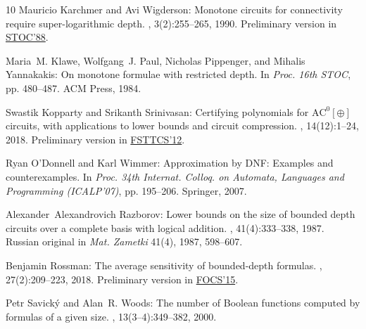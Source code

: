\documentclass[11pt]{article}
\numberwithin{equation}{section}
\theoremstyle{definition}
\theoremstyle{plain}
\begin{document}
\begin{thebibliography}{10}
{\sc Mauricio Karchmer and Avi Wigderson}: Monotone circuits for connectivity
  require super-logarithmic depth.
, 3(2):255--265, 1990.
\newblock Preliminary version in
  \href{http://doi.org/10.1145/62212.62265}{STOC'88}.
\newblock [\epfmtdoi{10.1137/0403021}]

{\sc Maria~M. Klawe, Wolfgang~J. Paul, Nicholas Pippenger, and Mihalis
  Yannakakis}: On monotone formulae with restricted depth.
\newblock In {\em Proc. 16th STOC}, pp. 480--487. ACM Press, 1984.
\newblock [\epfmtdoi{10.1145/800057.808717}]

{\sc Swastik Kopparty and Srikanth Srinivasan}: Certifying polynomials for
  $\mathrm{AC}^0[\oplus]$ circuits, with applications to lower bounds and
  circuit compression.
, 14(12):1--24, 2018.
\newblock Preliminary version in
  \href{http://drops.dagstuhl.de/opus/volltexte/2012/3846/}{FSTTCS'12}.

{\sc Ryan O'Donnell and Karl Wimmer}: Approximation by {DNF:} {E}xamples and
  counterexamples.
\newblock In {\em Proc. 34th Internat. Colloq. on Automata, Languages and
  Programming (ICALP'07)}, pp. 195--206. Springer, 2007.
\newblock [\epfmtdoi{10.1007/978-3-540-73420-8\_19}]

{\sc Alexander~Alexandrovich Razborov}: Lower bounds on the size of bounded
  depth circuits over a complete basis with logical addition.
,
  41(4):333--338, 1987.
\newblock Russian original in \emph{Mat. Zametki} 41(4), 1987, 598--607.
\newblock [\epfmtdoi{10.1007/BF01137685}]

{\sc Benjamin Rossman}: The average sensitivity of bounded-depth formulas.
, 27(2):209--223, 2018.
\newblock Preliminary version in
  \href{http://doi.org/10.1109/FOCS.2015.33}{FOCS'15}.

{\sc Petr Savick\'y and Alan~R. Woods}: The number of {B}oolean functions
  computed by formulas of a given size.
, 13(3--4):349--382, 2000.


\end{thebibliography}
\end{document}
